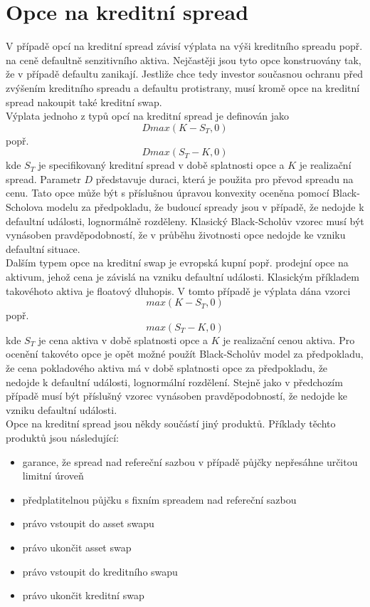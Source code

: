 \documentclass[a4paper]{book}
\begin{document}
\section{Opce na kreditní spread}

V případě opcí na kreditní spread závisí výplata na výši kreditního spreadu popř. na ceně defaultně senzitivního aktiva. Nejčastěji jsou tyto opce konstruovány tak, že v případě defaultu zanikají. Jestliže chce tedy investor současnou ochranu před zvýšením kreditního spreadu a defaultu protistrany, musí kromě opce na kreditní spread nakoupit také kreditní swap.\\

Výplata jednoho z typů opcí na kreditní spread je definován jako
\begin{equation*}
D max(K-S_T,0)
\end{equation*}
popř.
\begin{equation*}
D max(S_T - K,0)
\end{equation*}
kde $S_T$ je specifikovaný kreditní spread v době splatnosti opce a $K$ je realizační spread. Parametr $D$ představuje duraci, která je použita pro převod spreadu na cenu. Tato opce může být s příslušnou úpravou konvexity oceněna pomocí Black-Scholova modelu za předpokladu, že budoucí spready jsou v případě, že nedojde k defaultní události, lognormálně rozděleny. Klasický Black-Scholův vzorec musí být vynásoben pravděpodobností, že v průběhu životnosti opce nedojde ke vzniku defaultní situace.\\

Dalším typem opce na kreditní swap je evropská kupní popř. prodejní opce na aktivum, jehož cena je závislá na vzniku defaultní události. Klasickým příkladem takovéhoto aktiva je floatový dluhopis. V tomto případě je výplata dána vzorci
\begin{equation*}
max(K-S_T,0)
\end{equation*}
popř.
\begin{equation*}
max(S_T - K,0)
\end{equation*}
kde $S_T$ je cena aktiva v době splatnosti opce a $K$ je realizační cenou aktiva. Pro ocenění takovéto opce je opět možné použít Black-Scholův model za předpokladu, že cena pokladového aktiva má v době splatnosti opce za předpokladu, že nedojde k defaultní události, lognormální rozdělení. Stejně jako v předchozím případě musí být příslušný vzorec vynásoben pravděpodobností, že nedojde ke vzniku defaultní události.\\

Opce na kreditní spread jsou někdy součástí jiný produktů. Příklady těchto produktů jsou následující:
\begin{itemize}
\item garance, že spread nad refereční sazbou v případě půjčky nepřesáhne určitou limitní úroveň
\item předplatitelnou půjčku s fixním spreadem nad refereční sazbou
\item právo vstoupit do asset swapu
\item právo ukončit asset swap
\item právo vstoupit do kreditního swapu
\item právo ukončit kreditní swap
\end{itemize}
\end{document}

